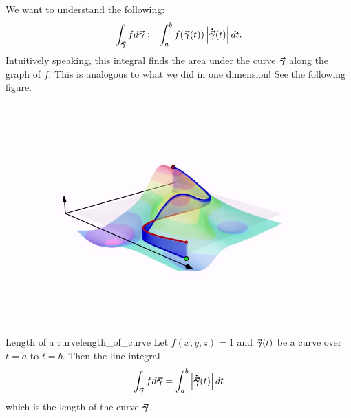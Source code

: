                       We want to understand the following:
                       \[
                       \int_{\boldsymbol{\vec{\gamma}}} fd\boldsymbol{\vec{\gamma}} \coloneqq \int_a^b f(\boldsymbol{\vec{\gamma}}(t))\left|\boldsymbol{\dot{\vec{\gamma}}}(t)\right|dt.
                       \]
                       Intuitively speaking, this integral finds the area under the curve $\boldsymbol{\vec{\gamma}}$ along the graph of $f$.  This is analogous to what we did in one dimension! See the following figure.
                       \begin{figure}[H]
                           \centering
                           \includegraphics[width=.5\textwidth]{Figures_Part_6/Line_integral_of_scalar_field.jpg}
                       \end{figure}
                       
                       \begin{ex}{Length of a curve}{length_of_curve}
                       Let $f(x,y,z)=1$ and $\boldsymbol{\vec{\gamma}}(t)$ be a curve over $t=a$ to $t=b$.  Then the line integral
                       \[
                       \int_{\boldsymbol{\vec{\gamma}}} fd\boldsymbol{\vec{\gamma}} = \int_a^b \left|\boldsymbol{\dot{\vec{\gamma}}}(t)\right|dt
                       \]
                      which is the length of the curve $\boldsymbol{\vec{\gamma}}$.
                       \end{ex}
                       
